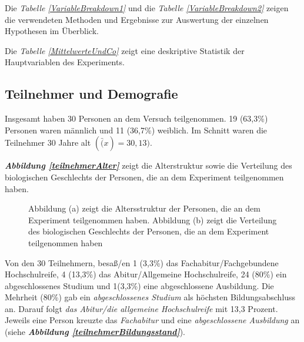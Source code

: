 \documentclass[a4paper,11pt]{article}%
\renewcommand{\\}{\vspace*{0.5\baselineskip} \newline}
\begin{document}
Die \textit{Tabelle \ref{VariableBreakdown1}} und die \textit{Tabelle \ref{VariableBreakdown2}} zeigen die verwendeten Methoden und Ergebnisse zur Auswertung der einzelnen Hypothesen im Überblick.

Die \textit{Tabelle \ref{MittelwerteUndCo}} zeigt eine deskriptive Statistik der Hauptvariablen des Experiments.
	\subsection{Teilnehmer und Demografie}
Insgesamt haben 30 Personen an dem Versuch teilgenommen. 19 (63,3\%) Personen waren männlich und 11 (36,7\%) weiblich. Im Schnitt waren die Teilnehmer 30 Jahre alt $(\bar(x) = 30,13)$.

\textbf{\textit{Abbildung \ref{teilnehmerAlter}}} zeigt die Alterstruktur sowie die Verteilung des biologischen Geschlechts der Personen, die an dem Experiment teilgenommen haben. 

	\begin{figure}[h]
  \centering
  \qquad
  \caption[Altersstruktur und biologisches Geschlecht der Teilnehmer]{Abbildung (a) zeigt die Altersstruktur der Personen, die an dem Experiment teilgenommen haben. Abbildung (b) zeigt die Verteilung des biologischen Geschlechts der Personen, die an dem Experiment teilgenommen haben}
  \label{teilnehmer Alter}
\end{figure}

Von den 30 Teilnehmern, besaß/en 1 (3,3\%) das Fachabitur/Fachgebundene Hochschulreife, 4 (13,3\%) das Abitur/Allgemeine Hochschulreife, 24 (80\%) ein abgeschlossenes Studium und 1(3,3\%) eine abgeschlossene Ausbildung. 
Die Mehrheit (80\%)  gab ein \textit{abgeschlossenes Studium} als höchsten Bildungsabschluss an. Darauf folgt \textit{das Abitur/die allgemeine Hochschulreife} mit 13,3 Prozent. Jeweils eine Person kreuzte das \textit{Fachabitur} und eine \textit{abgeschlossene Ausbildung} an (siehe \textbf{\textit{Abbildung \ref{teilnehmerBildungsstand}}}).
\end{document}
